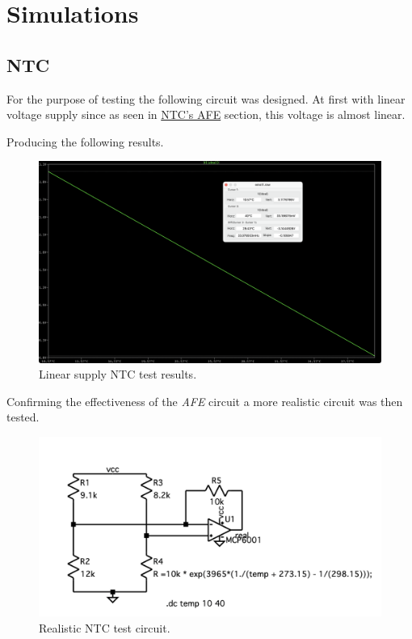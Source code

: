 \documentclass[12pt]{article}
\begin{document}
\newpage
\section{Simulations}
\subsection{NTC}
    
    For the purpose of testing the following circuit was designed.
    At first with linear voltage supply since as seen in \hyperref[AFENTC]{NTC's AFE} section, this voltage is almost linear.

    Producing the following results.
 
    \begin{figure}[H] 
        \centering
        \includegraphics*[scale = 0.3]{images/NTCLinearRes.png}
        \caption{Linear supply NTC test results.}
        \label{wrap-fig:1}
    \end{figure}

    Confirming the effectiveness of the \textit{AFE} circuit a more realistic
    circuit was then tested.

    \begin{figure}[H] 
        \centering
        \includegraphics*[scale = 0.45]{images/NTCRealTb.png}
        \caption{Realistic NTC test circuit.}
        \label{wrap-fig:1}
    \end{figure}
    
\end{document}
